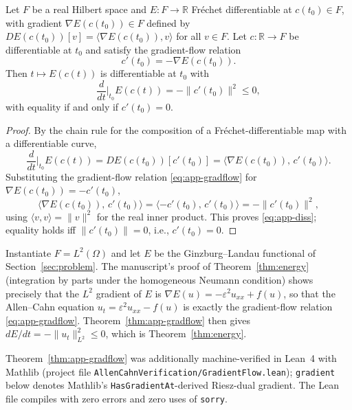 \begin{Theorem}\label{thm:app-gradflow}
Let $F$ be a real Hilbert space and $E:F\to\mathbb{R}$ Fr\'echet differentiable at $c(t_0)\in F$, with gradient $\nabla E(c(t_0))\in F$ defined by $DE(c(t_0))[v]=\langle\nabla E(c(t_0)),v\rangle$ for all $v\in F$. Let $c:\mathbb{R}\to F$ be differentiable at $t_0$ and satisfy the gradient-flow relation
\begin{equation}\label{eq:app-gradflow}
c'(t_0) = -\nabla E(c(t_0)).
\end{equation}
Then $t\mapsto E(c(t))$ is differentiable at $t_0$ with
\begin{equation}\label{eq:app-diss}
\frac{d}{dt}\bigg|_{t_0} E(c(t)) = -\|c'(t_0)\|^2 \le 0,
\end{equation}
with equality if and only if $c'(t_0)=0$.
\end{Theorem}
\begin{proof}
By the chain rule for the composition of a Fr\'echet-differentiable map with a differentiable curve,
\[
\frac{d}{dt}\bigg|_{t_0} E(c(t)) = DE(c(t_0))[c'(t_0)] = \langle \nabla E(c(t_0)),\,c'(t_0)\rangle.
\]
Substituting the gradient-flow relation \eqref{eq:app-gradflow} for $\nabla E(c(t_0))=-c'(t_0)$,
\[
\langle \nabla E(c(t_0)),\,c'(t_0)\rangle = \langle -c'(t_0),\,c'(t_0)\rangle = -\|c'(t_0)\|^2,
\]
using $\langle v,v\rangle=\|v\|^2$ for the real inner product. This proves \eqref{eq:app-diss}; equality holds iff $\|c'(t_0)\|=0$, i.e., $c'(t_0)=0$.
\end{proof}

\begin{Corollary}
Instantiate $F=L^2(\Omega)$ and let $E$ be the Ginzburg--Landau functional of Section~\ref{sec:problem}. The manuscript's proof of Theorem~\ref{thm:energy} (integration by parts under the homogeneous Neumann condition) shows precisely that the $L^2$ gradient of $E$ is $\nabla E(u)=-\varepsilon^2u_{xx}+f(u)$, so that the Allen--Cahn equation $u_t=\varepsilon^2u_{xx}-f(u)$ is exactly the gradient-flow relation \eqref{eq:app-gradflow}. Theorem~\ref{thm:app-gradflow} then gives $dE/dt=-\|u_t\|^2_{L^2}\le0$, which is Theorem~\ref{thm:energy}.
\end{Corollary}

Theorem~\ref{thm:app-gradflow} was additionally machine-verified in Lean~4 with Mathlib (project file \texttt{AllenCahnVerification/GradientFlow.lean}); \texttt{gradient} below denotes Mathlib's \texttt{HasGradientAt}-derived Riesz-dual gradient. The Lean file compiles with zero errors and zero uses of \texttt{sorry}.

